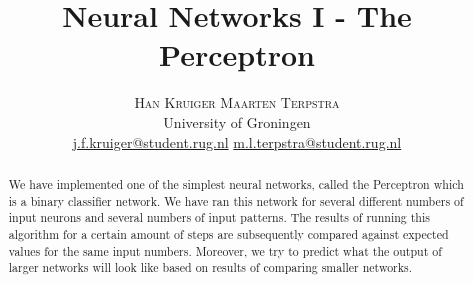 \documentclass[twoside]{article}
\title{\vspace{-15mm}\fontsize{24pt}{10pt}\selectfont\textbf{Neural Networks I - The Perceptron}} %
\author{
\large
\hspace{6mm}\textsc{Han Kruiger} \hspace{12mm} \textsc{Maarten Terpstra}\\[2mm] %
\normalsize University of Groningen \\ %
\normalsize \href{mailto:j.f.kruiger@student.rug.nl}{j.f.kruiger@student.rug.nl} \hspace{5mm} \normalsize \href{mailto:m.l.terpstra@student.rug.nl}{m.l.terpstra@student.rug.nl} %
\vspace{-5mm}
}
\date{}
\begin{document}
\maketitle %

\thispagestyle{fancy} %


\begin{abstract}

\noindent We have implemented one of the simplest neural networks, called the Perceptron which is a binary classifier network. We have ran this network for several different numbers of input neurons and several numbers of input patterns. The results of running this algorithm for a certain amount of steps are subsequently compared against expected values for the same input numbers. Moreover, we try to predict what the output of larger networks will look like based on results of comparing smaller networks. 

\end{abstract}

\end{document}
